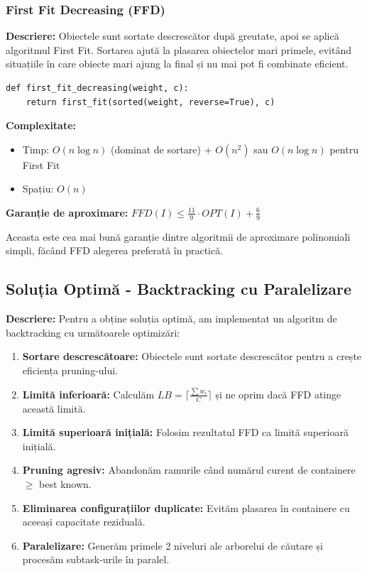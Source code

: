\documentclass[runningheads]{llncs}
\begin{document}
\subsubsection{First Fit Decreasing (FFD)}

\textbf{Descriere:} Obiectele sunt sortate descrescător după greutate, apoi se aplică algoritmul First Fit. Sortarea ajută la plasarea obiectelor mari primele, evitând situațiile în care obiecte mari ajung la final și nu mai pot fi combinate eficient.

\begin{tcolorbox}[BoxPurple, title=\faIcon{code} Implementare FFD (Python), fonttitle=\bfseries]
\begin{lstlisting}
def first_fit_decreasing(weight, c):
    return first_fit(sorted(weight, reverse=True), c)
\end{lstlisting}
\end{tcolorbox}

\textbf{Complexitate:}
\begin{itemize}
    \item Timp: $O(n \log n)$ (dominat de sortare) + $O(n^2)$ sau $O(n \log n)$ pentru First Fit
    \item Spațiu: $O(n)$
\end{itemize}

\textbf{Garanție de aproximare:} $FFD(I) \leq \frac{11}{9} \cdot OPT(I) + \frac{6}{9}$ \cite{dosa2007tight}

Aceasta este cea mai bună garanție dintre algoritmii de aproximare polinomiali simpli, făcând FFD alegerea preferată în practică.

\subsection{Soluția Optimă - Backtracking cu Paralelizare}

\textbf{Descriere:} Pentru a obține soluția optimă, am implementat un algoritm de backtracking cu următoarele optimizări:

\begin{enumerate}
    \item \textbf{Sortare descrescătoare:} Obiectele sunt sortate descrescător pentru a crește eficiența pruning-ului.
    \item \textbf{Limită inferioară:} Calculăm $LB = \lceil \frac{\sum w_i}{C} \rceil$ și ne oprim dacă FFD atinge această limită.
    \item \textbf{Limită superioară inițială:} Folosim rezultatul FFD ca limită superioară inițială.
    \item \textbf{Pruning agresiv:} Abandonăm ramurile când numărul curent de containere $\geq$ best known.
    \item \textbf{Eliminarea configurațiilor duplicate:} Evităm plasarea în containere cu aceeași capacitate reziduală.
    \item \textbf{Paralelizare:} Generăm primele 2 niveluri ale arborelui de căutare și procesăm subtask-urile în paralel.
\end{enumerate}
\end{document}
